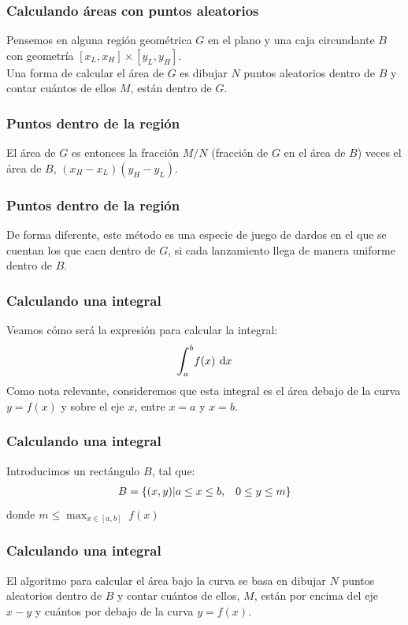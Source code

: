 \documentclass[12pt]{beamer}
\begin{document}
\begin{frame}
\frametitle{Calculando áreas con puntos aleatorios}
Pensemos en alguna región geométrica $G$ en el plano y una caja circundante $B$ con geometría $[x_{L}, x_{H}] \times [y_{L}, y_{H}]$.
\\
\bigskip
\pause
Una forma de calcular el área de $G$ es dibujar $N$ puntos aleatorios dentro de $B$ y contar cuántos de ellos $M$, están dentro de $G$.
\end{frame}
\begin{frame}
\frametitle{Puntos dentro de la región}
El área de $G$ es entonces la fracción $M/N$ (fracción de $G$ en el área de $B$) veces el área de $B$, $(x_{H} - x_{L})(y_{H} - y_{L})$.
\end{frame}
\begin{frame}
\frametitle{Puntos dentro de la región}
De forma diferente, este método es una especie de juego de dardos en el que se cuentan los que caen dentro de $G$, si cada lanzamiento llega de manera uniforme dentro de $B$.
\end{frame}
\begin{frame}
\frametitle{Calculando una integral}
Veamos cómo será la expresión para calcular la integral:
\pause
\begin{align*}
\scaleint{6ex}_{\bs a}^{b} f (x) \: \dd{x}
\end{align*}
Como nota relevante, consideremos que esta integral es el área debajo de la curva $y = f (x)$ y sobre el eje $x$, entre $x = a$ y $x = b$.
\end{frame}
\begin{frame}
\frametitle{Calculando una integral}
Introducimos un rectángulo $B$, tal que:
\begin{align*}
B = \{ (x, y) \vert a \leq x \leq b, \hspace{0.3cm} 0 \leq y \leq m \}
\end{align*}
donde $m \leq \max_{x \in [a, b]} \; f (x)$
\end{frame}
\begin{frame}
\frametitle{Calculando una integral}
El algoritmo para calcular el área bajo la curva se basa en dibujar $N$ puntos aleatorios dentro de $B$ y contar cuántos de ellos, $M$, están por encima del eje $x-y$  y cuántos por debajo de la curva $y = f (x)$.
\end{frame}
\end{document}
